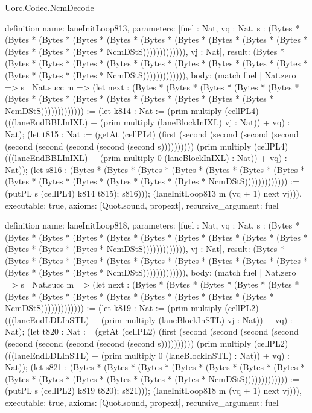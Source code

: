 \begin{lexlean}{Uorc.Codec.NcmDecode}
\begin{semanticmodule}
definition{
  name: laneInitLoop813,
  parameters: [fuel : Nat, vq : Nat, s : (Bytes * (Bytes * (Bytes * (Bytes * (Bytes * (Bytes * (Bytes * (Bytes * (Bytes * (Bytes * (Bytes * (Bytes * (Bytes * NcmDStS))))))))))))), vj : Nat],
  result: (Bytes * (Bytes * (Bytes * (Bytes * (Bytes * (Bytes * (Bytes * (Bytes * (Bytes * (Bytes * (Bytes * (Bytes * (Bytes * NcmDStS))))))))))))),
  body: (match fuel
    | Nat.zero => s
    | Nat.succ m => (let next : (Bytes * (Bytes * (Bytes * (Bytes * (Bytes * (Bytes * (Bytes * (Bytes * (Bytes * (Bytes * (Bytes * (Bytes * (Bytes * NcmDStS))))))))))))) := (let k814 : Nat := (prim multiply (cellPL4) (((laneEndBBLInIXL) + (prim multiply (laneBlockInIXL) vj : Nat)) + vq) : Nat); (let t815 : Nat := (getAt (cellPL4) (first (second (second (second (second (second (second (second (second (second s)))))))))) (prim multiply (cellPL4) (((laneEndBBLInIXL) + (prim multiply 0 (laneBlockInIXL) : Nat)) + vq) : Nat)); (let s816 : (Bytes * (Bytes * (Bytes * (Bytes * (Bytes * (Bytes * (Bytes * (Bytes * (Bytes * (Bytes * (Bytes * (Bytes * (Bytes * NcmDStS))))))))))))) := (putPL s (cellPL4) k814 t815); s816))); (laneInitLoop813 m (vq + 1) next vj))),
  executable: true,
  axioms: [Quot.sound, propext],
  recursive_argument: fuel
}

definition{
  name: laneInitLoop818,
  parameters: [fuel : Nat, vq : Nat, s : (Bytes * (Bytes * (Bytes * (Bytes * (Bytes * (Bytes * (Bytes * (Bytes * (Bytes * (Bytes * (Bytes * (Bytes * (Bytes * NcmDStS))))))))))))), vj : Nat],
  result: (Bytes * (Bytes * (Bytes * (Bytes * (Bytes * (Bytes * (Bytes * (Bytes * (Bytes * (Bytes * (Bytes * (Bytes * (Bytes * NcmDStS))))))))))))),
  body: (match fuel
    | Nat.zero => s
    | Nat.succ m => (let next : (Bytes * (Bytes * (Bytes * (Bytes * (Bytes * (Bytes * (Bytes * (Bytes * (Bytes * (Bytes * (Bytes * (Bytes * (Bytes * NcmDStS))))))))))))) := (let k819 : Nat := (prim multiply (cellPL2) (((laneEndLDLInSTL) + (prim multiply (laneBlockInSTL) vj : Nat)) + vq) : Nat); (let t820 : Nat := (getAt (cellPL2) (first (second (second (second (second (second (second (second (second (second s)))))))))) (prim multiply (cellPL2) (((laneEndLDLInSTL) + (prim multiply 0 (laneBlockInSTL) : Nat)) + vq) : Nat)); (let s821 : (Bytes * (Bytes * (Bytes * (Bytes * (Bytes * (Bytes * (Bytes * (Bytes * (Bytes * (Bytes * (Bytes * (Bytes * (Bytes * NcmDStS))))))))))))) := (putPL s (cellPL2) k819 t820); s821))); (laneInitLoop818 m (vq + 1) next vj))),
  executable: true,
  axioms: [Quot.sound, propext],
  recursive_argument: fuel
}


\end{semanticmodule}
\end{lexlean}
